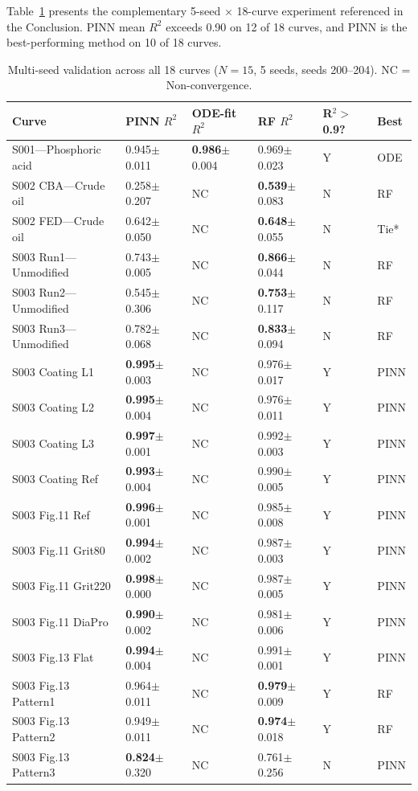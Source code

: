 \documentclass[review]{elsarticle}
\begin{document}
Table~\ref{tab:all18_5seed} presents the complementary 5-seed $\times$ 18-curve experiment referenced in the Conclusion. PINN mean $R^2$ exceeds 0.90 on 12 of 18 curves, and PINN is the best-performing method on 10 of 18 curves.

\begin{table}[htbp]
\centering
\caption{Multi-seed validation across all 18 curves ($N=15$, 5 seeds, seeds 200--204). NC = Non-convergence.}
\label{tab:all18_5seed}
\footnotesize
\begin{tabular}{@{}p{3.5cm}lllll@{}}
\toprule
Curve & PINN $R^2$ & ODE-fit $R^2$ & RF $R^2$ & R$^2>$0.9? & Best \\
\midrule
S001---Phosphoric acid & 0.945$\pm$0.011 & \textbf{0.986}$\pm$0.004 & 0.969$\pm$0.023 & Y & ODE \\
S002 CBA---Crude oil & 0.258$\pm$0.207 & NC & \textbf{0.539}$\pm$0.083 & N & RF \\
S002 FED---Crude oil & 0.642$\pm$0.050 & NC & \textbf{0.648}$\pm$0.055 & N & Tie* \\
S003 Run1---Unmodified & 0.743$\pm$0.005 & NC & \textbf{0.866}$\pm$0.044 & N & RF \\
S003 Run2---Unmodified & 0.545$\pm$0.306 & NC & \textbf{0.753}$\pm$0.117 & N & RF \\
S003 Run3---Unmodified & 0.782$\pm$0.068 & NC & \textbf{0.833}$\pm$0.094 & N & RF \\
S003 Coating L1 & \textbf{0.995}$\pm$0.003 & NC & 0.976$\pm$0.017 & Y & PINN \\
S003 Coating L2 & \textbf{0.995}$\pm$0.004 & NC & 0.976$\pm$0.011 & Y & PINN \\
S003 Coating L3 & \textbf{0.997}$\pm$0.001 & NC & 0.992$\pm$0.003 & Y & PINN \\
S003 Coating Ref & \textbf{0.993}$\pm$0.004 & NC & 0.990$\pm$0.005 & Y & PINN \\
S003 Fig.11 Ref & \textbf{0.996}$\pm$0.001 & NC & 0.985$\pm$0.008 & Y & PINN \\
S003 Fig.11 Grit80 & \textbf{0.994}$\pm$0.002 & NC & 0.987$\pm$0.003 & Y & PINN \\
S003 Fig.11 Grit220 & \textbf{0.998}$\pm$0.000 & NC & 0.987$\pm$0.005 & Y & PINN \\
S003 Fig.11 DiaPro & \textbf{0.990}$\pm$0.002 & NC & 0.981$\pm$0.006 & Y & PINN \\
S003 Fig.13 Flat & \textbf{0.994}$\pm$0.004 & NC & 0.991$\pm$0.001 & Y & PINN \\
S003 Fig.13 Pattern1 & 0.964$\pm$0.011 & NC & \textbf{0.979}$\pm$0.009 & Y & RF \\
S003 Fig.13 Pattern2 & 0.949$\pm$0.011 & NC & \textbf{0.974}$\pm$0.018 & Y & RF \\
S003 Fig.13 Pattern3 & \textbf{0.824}$\pm$0.320 & NC & 0.761$\pm$0.256 & N & PINN \\
\bottomrule
\end{tabular}


\end{table}
\end{document}
